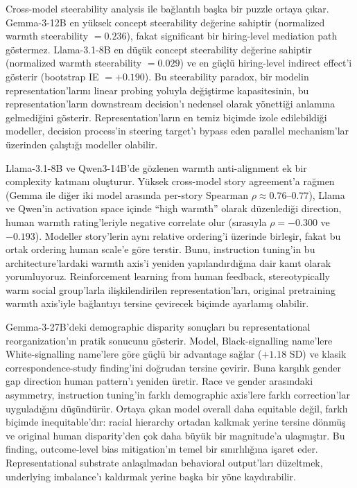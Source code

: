 \documentclass[twocolumn]{article}
\begin{document}
Cross-model steerability analysis ile bağlantılı başka bir puzzle ortaya çıkar.
Gemma-3-12B en yüksek concept steerability değerine sahiptir (normalized warmth
steerability $= 0.236$), fakat significant bir hiring-level mediation path
göstermez. Llama-3.1-8B en düşük concept steerability değerine sahiptir
(normalized warmth steerability $= 0.029$) ve en güçlü hiring-level indirect
effect'i gösterir (bootstrap IE $= +0.190$). Bu steerability paradox, bir modelin
representation'larını linear probing yoluyla değiştirme kapasitesinin, bu
representation'ların downstream decision'ı nedensel olarak yönettiği anlamına
gelmediğini gösterir. Representation'ların en temiz biçimde izole edilebildiği
modeller, decision process'in steering target'ı bypass eden parallel mechanism'lar
üzerinden çalıştığı modeller olabilir.

Llama-3.1-8B ve Qwen3-14B'de gözlenen warmth anti-alignment ek bir complexity
katmanı oluşturur. Yüksek cross-model story agreement'a rağmen (Gemma ile diğer
iki model arasında per-story Spearman $\rho \approx 0.76$--$0.77$), Llama ve
Qwen'in activation space içinde ``high warmth'' olarak düzenlediği direction,
human warmth rating'leriyle negative correlate olur (sırasıyla $\rho = -0.300$
ve $-0.193$). Modeller story'lerin aynı relative ordering'i üzerinde birleşir,
fakat bu ortak ordering human scale'e göre terstir. Bunu, instruction tuning'in
bu architecture'lardaki warmth axis'i yeniden yapılandırdığına dair kanıt olarak
yorumluyoruz. Reinforcement learning from human feedback, stereotypically warm
social group'larla ilişkilendirilen representation'ları, original pretraining
warmth axis'iyle bağlantıyı tersine çevirecek biçimde ayarlamış olabilir.

Gemma-3-27B'deki demographic disparity sonuçları bu representational
reorganization'ın pratik sonucunu gösterir. Model, Black-signalling name'lere
White-signalling name'lere göre güçlü bir advantage sağlar ($+1.18$ SD) ve
klasik correspondence-study finding'ini doğrudan tersine çevirir. Buna karşılık
gender gap direction human pattern'ı yeniden üretir. Race ve gender arasındaki
asymmetry, instruction tuning'in farklı demographic axis'lere farklı
correction'lar uyguladığını düşündürür. Ortaya çıkan model overall daha
equitable değil, farklı biçimde inequitable'dır: racial hierarchy ortadan
kalkmak yerine tersine dönmüş ve original human disparity'den çok daha büyük
bir magnitude'a ulaşmıştır. Bu finding, outcome-level bias mitigation'ın temel
bir sınırlılığına işaret eder. Representational substrate anlaşılmadan
behavioral output'ları düzeltmek, underlying imbalance'ı kaldırmak yerine başka
bir yöne kaydırabilir.
\end{document}
